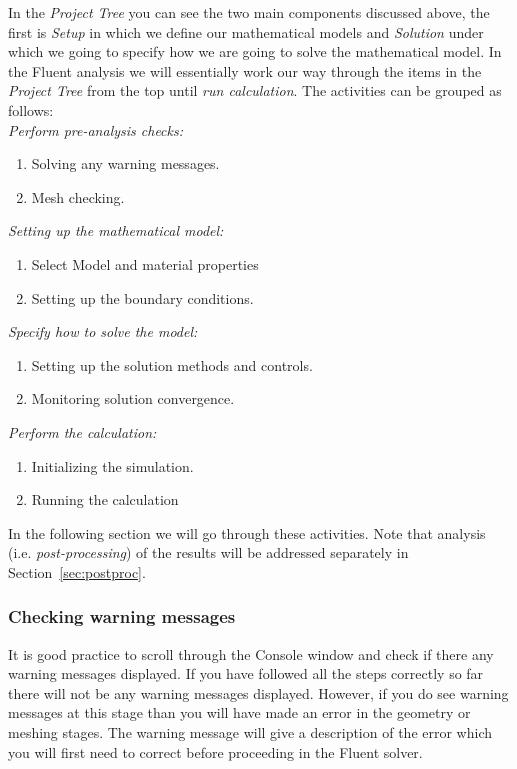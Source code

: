 \documentclass[11pt,a4paper,oneside,hidelinks]{scrartcl}
\begin{document}
In the \emph{Project Tree} you can see the two main components discussed above, the first is \emph{Setup} in which we define our mathematical models and \emph{Solution} under which we going to specify how we are going to solve the mathematical model.
In the Fluent analysis we will essentially work our way through the items in the \emph{Project Tree} from the top until \emph{run calculation}. The activities can be grouped as follows:\\

\emph{Perform pre-analysis checks:}
\begin{enumerate}[nolistsep]
    \item	Solving any warning messages.
    \item	Mesh checking.
\end{enumerate}
\emph{Setting up the mathematical model:}
\begin{enumerate}
    \item	Select Model and material properties
    \item	Setting up the boundary conditions.
\end{enumerate}
\emph{Specify how to solve the model:}
\begin{enumerate}
    \item   Setting up the solution methods and controls.
    \item	Monitoring solution convergence.
\end{enumerate}
\emph{Perform the calculation:}
\begin{enumerate}
    \item	Initializing the simulation.
    \item	Running the calculation
\end{enumerate}

In the following section we will go through these activities. Note that analysis (i.e. \emph{post-processing}) of the results will be addressed separately in Section~\ref{sec:postproc}.

\subsubsection{Checking warning messages}
It is good practice to scroll through the Console window and check if there any warning messages displayed. If you have followed all the steps correctly so far there will not be any warning messages displayed. However, if you do see warning messages at this stage than you will have made an error in the geometry or meshing stages. The warning message will give a description of the error which you will first need to correct before proceeding in the Fluent solver.
\end{document}
